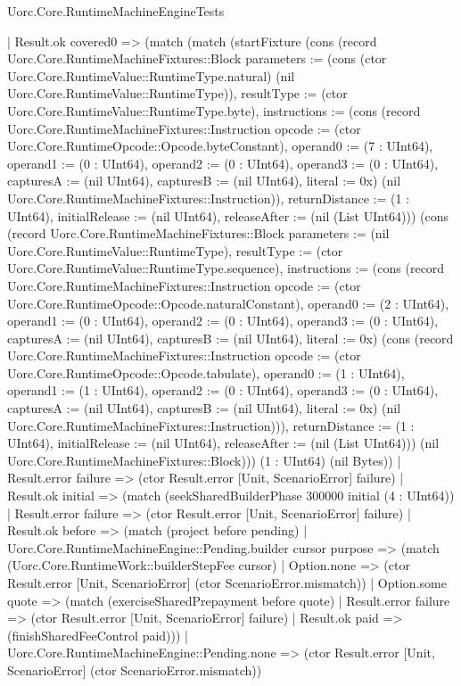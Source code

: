 \begin{lexlean}{Uorc.Core.RuntimeMachineEngineTests}
\begin{semanticmodule}
{    | Result.ok covered0 => (match (match (startFixture (cons (record Uorc.Core.RuntimeMachineFixtures::Block {parameters := (cons (ctor Uorc.Core.RuntimeValue::RuntimeType.natural) (nil Uorc.Core.RuntimeValue::RuntimeType)), resultType := (ctor Uorc.Core.RuntimeValue::RuntimeType.byte), instructions := (cons (record Uorc.Core.RuntimeMachineFixtures::Instruction {opcode := (ctor Uorc.Core.RuntimeOpcode::Opcode.byteConstant), operand0 := (7 : UInt64), operand1 := (0 : UInt64), operand2 := (0 : UInt64), operand3 := (0 : UInt64), capturesA := (nil UInt64), capturesB := (nil UInt64), literal := 0x}) (nil Uorc.Core.RuntimeMachineFixtures::Instruction)), returnDistance := (1 : UInt64), initialRelease := (nil UInt64), releaseAfter := (nil (List UInt64))}) (cons (record Uorc.Core.RuntimeMachineFixtures::Block {parameters := (nil Uorc.Core.RuntimeValue::RuntimeType), resultType := (ctor Uorc.Core.RuntimeValue::RuntimeType.sequence), instructions := (cons (record Uorc.Core.RuntimeMachineFixtures::Instruction {opcode := (ctor Uorc.Core.RuntimeOpcode::Opcode.naturalConstant), operand0 := (2 : UInt64), operand1 := (0 : UInt64), operand2 := (0 : UInt64), operand3 := (0 : UInt64), capturesA := (nil UInt64), capturesB := (nil UInt64), literal := 0x}) (cons (record Uorc.Core.RuntimeMachineFixtures::Instruction {opcode := (ctor Uorc.Core.RuntimeOpcode::Opcode.tabulate), operand0 := (1 : UInt64), operand1 := (1 : UInt64), operand2 := (0 : UInt64), operand3 := (0 : UInt64), capturesA := (nil UInt64), capturesB := (nil UInt64), literal := 0x}) (nil Uorc.Core.RuntimeMachineFixtures::Instruction))), returnDistance := (1 : UInt64), initialRelease := (nil UInt64), releaseAfter := (nil (List UInt64))}) (nil Uorc.Core.RuntimeMachineFixtures::Block))) (1 : UInt64) (nil Bytes))
        | Result.error failure => (ctor Result.error [Unit, ScenarioError] failure)
        | Result.ok initial => (match (seekSharedBuilderPhase 300000 initial (4 : UInt64))
          | Result.error failure => (ctor Result.error [Unit, ScenarioError] failure)
          | Result.ok before => (match (project before pending)
            | Uorc.Core.RuntimeMachineEngine::Pending.builder cursor purpose => (match (Uorc.Core.RuntimeWork::builderStepFee cursor)
              | Option.none => (ctor Result.error [Unit, ScenarioError] (ctor ScenarioError.mismatch))
              | Option.some quote => (match (exerciseSharedPrepayment before quote)
                | Result.error failure => (ctor Result.error [Unit, ScenarioError] failure)
                | Result.ok paid => (finishSharedFeeControl paid)))
            | Uorc.Core.RuntimeMachineEngine::Pending.none => (ctor Result.error [Unit, ScenarioError] (ctor ScenarioError.mismatch))
}
\end{semanticmodule}
\end{lexlean}
